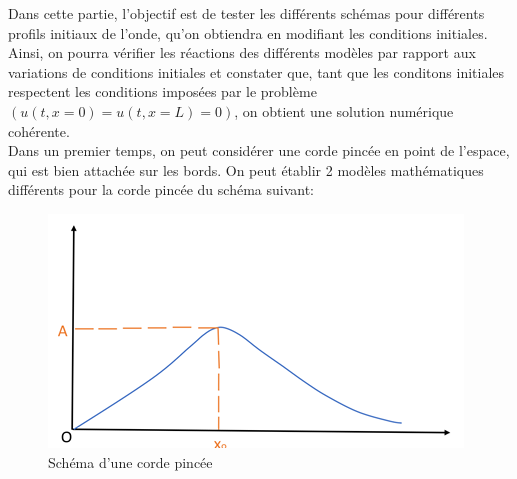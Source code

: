Dans cette partie, l'objectif est de tester les différents schémas pour différents profils initiaux de l'onde, qu'on obtiendra en modifiant les conditions initiales. \\

Ainsi, on pourra vérifier les réactions des différents modèles par rapport aux variations de conditions initiales et constater que, tant que les conditons initiales respectent les conditions imposées par le problème $(u(t,x=0)=u(t,x=L)=0)$, on obtient une solution numérique cohérente.\\

Dans un premier temps, on peut considérer une corde pincée en point de l'espace, qui est bien attachée sur les bords.
On peut établir 2 modèles mathématiques différents pour la corde pincée du schéma suivant:

\begin{figure}[H]
\centering
\includegraphics[scale=0.5]{image2.png}
\caption{Schéma d'une corde pincée}
\label{fig1}
\end{figure}



